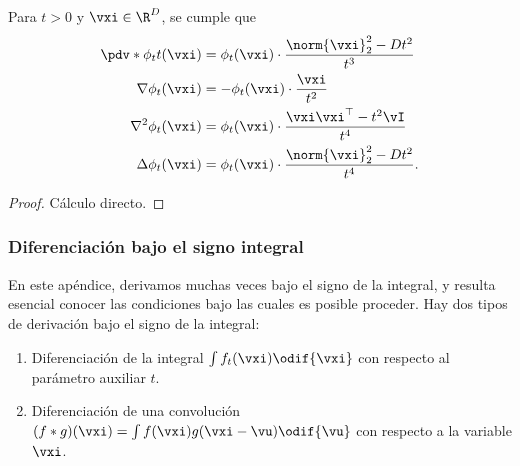 \documentclass[../../book-main_es.tex]{subfiles}
\begin{document}
\begin{proposition}\label{prop:normal_derivatives}
    Para \(t > 0\) y \(\vxi \in \R^{D}\), se cumple que
    \begin{align}
        \pdv*{\phi_{t}}{t}(\vxi)
        &= \phi_{t}(\vxi) \cdot \frac{\norm{\vxi}_{2}^{2} - Dt^{2}}{t^{3}} \\
        \nabla \phi_{t}(\vxi)
        &= -\phi_{t}(\vxi)\cdot\frac{\vxi}{t^{2}} \\
        \nabla^{2} \phi_{t}(\vxi)
        &= \phi_{t}(\vxi)\cdot\frac{\vxi\vxi^{\top} - t^{2}\vI}{t^{4}} \\
        \Delta \phi_{t}(\vxi)
        &= \phi_{t}(\vxi) \cdot \frac{\norm{\vxi}_{2}^{2} - Dt^{2}}{t^{4}}.
    \end{align}
\end{proposition}
\begin{proof}
    Cálculo directo.
\end{proof}

\subsubsection{Diferenciación bajo el signo integral}

En este apéndice, derivamos muchas
veces bajo el signo de la integral, y resulta esencial conocer las condiciones 
bajo las cuales es posible proceder. Hay dos
tipos de derivación bajo el signo de la integral:
\begin{enumerate}
    \item Diferenciación de la integral \(\int f_{t}(\vxi)\odif{\vxi}\)
        con respecto al parámetro auxiliar \(t\).
    \item Diferenciación de una convolución \((f * g)(\vxi) = \int
        f(\vxi)g(\vxi - \vu)\odif{\vu}\) con respecto a la variable \(\vxi\).
\end{enumerate}
\end{document}
